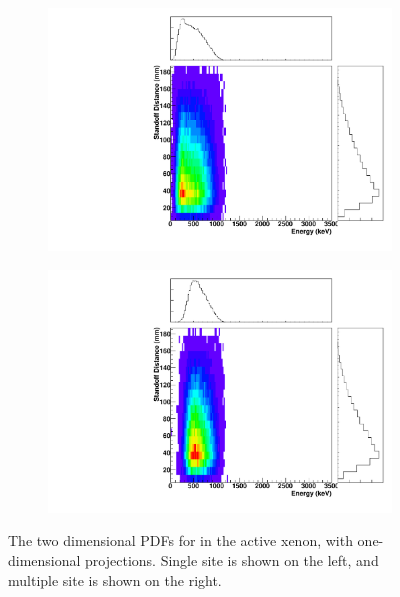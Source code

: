 \documentclass[herrin-thesis.tex]{subfiles}
\begin{document}
\begin{figure}[hp]
\centering
	\begin{subfigure}[b]{0.48\textwidth}
	\centering
	\includegraphics[width=\textwidth]{./plots/PDFs/analysis_pdf_ActiveLXe_Xe135_ss.pdf}
\end{subfigure}\hfill%
\begin{subfigure}[b]{0.48\textwidth}
	\centering
	\includegraphics[width=1\textwidth]{./plots/PDFs/analysis_pdf_ActiveLXe_Xe135_ms.pdf}
	\end{subfigure}
\caption[PDF for  in the active xenon]{The two dimensional PDFs for  in the active xenon, with one-dimensional projections. Single site is shown on the left, and multiple site is shown on the right.}
\label{fig:analysis_pdf_ActiveLXe_Xe135}
\end{figure}
\end{document}
